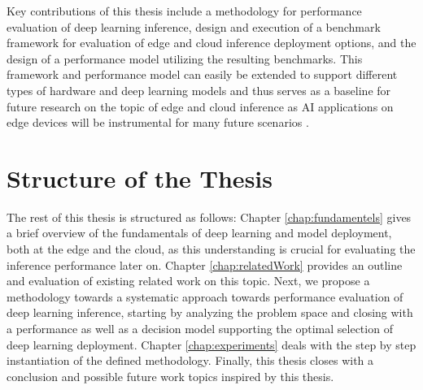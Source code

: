 Key contributions of this thesis include a methodology for performance evaluation of deep learning inference, design and execution of a benchmark framework for evaluation of edge and cloud inference deployment options, and the design of a performance model utilizing the resulting benchmarks.
This framework and performance model can easily be extended to support different types of hardware and deep learning models and thus serves as a baseline for future research on the topic of edge and cloud inference as AI applications on edge devices will be instrumental for many future scenarios \cite{futureMLtiny, MovingToEdge}.



\section{Structure of the Thesis}
The rest of this thesis is structured as follows: 
Chapter \ref{chap:fundamentels} gives a brief overview of the fundamentals of deep learning and model deployment, both at the edge and the cloud, as this understanding is crucial for evaluating the inference performance later on.
Chapter \ref{chap:relatedWork} provides an outline and evaluation of existing related work on this topic. 
Next, we propose a methodology towards a systematic approach towards performance evaluation of deep learning inference, starting by analyzing the problem space and closing with a performance as well as a decision model supporting the optimal selection of deep learning deployment.
Chapter \ref{chap:experiments} deals with the step by step instantiation of the defined methodology.
Finally, this thesis closes with a conclusion and possible future work topics inspired by this thesis.

